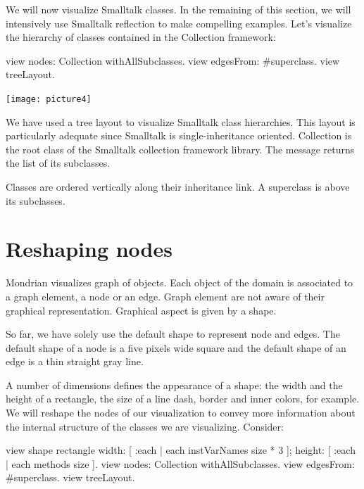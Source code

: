 \documentclass[a4paper,10pt,twoside]{book}
\begin{document}
We will now visualize Smalltalk classes. In the remaining of this section, we will intensively use Smalltalk reflection to make compelling examples. Let's visualize the hierarchy of classes contained in the Collection framework:

\begin{code}{}
view nodes: Collection withAllSubclasses.
view edgesFrom: #superclass.
view treeLayout.
\end{code}
\begin{center}\texttt{[image: picture4]}\end{center}


We have used a tree layout to visualize Smalltalk class hierarchies. This layout is particularly adequate since Smalltalk is single-inheritance oriented. Collection is the root class of the Smalltalk collection framework library. The message  returns the list of its subclasses.

Classes are ordered vertically along their inheritance link. A superclass is above its subclasses. 


\section{Reshaping nodes}

Mondrian visualizes graph of objects. Each object of the domain is associated to a graph element, a node or an edge. Graph element are not aware of their graphical representation. Graphical aspect is given by a shape. 

So far, we have solely use the default shape to represent node and edges. The default shape of a node is a five pixels wide square and the default shape of an edge is a thin straight gray line.

A number of dimensions defines the appearance of a shape: the width and the height of a rectangle, the size of a line dash, border and inner colors, for example. We will reshape the nodes of our visualization to convey more information about the internal structure of the classes we are visualizing. Consider:

\begin{code}{}
view shape rectangle
  width: [ :each | each instVarNames size * 3 ];
  height: [ :each | each methods size ].
view nodes: Collection withAllSubclasses.
view edgesFrom: #superclass.
view treeLayout.
\end{code}
\end{document}
